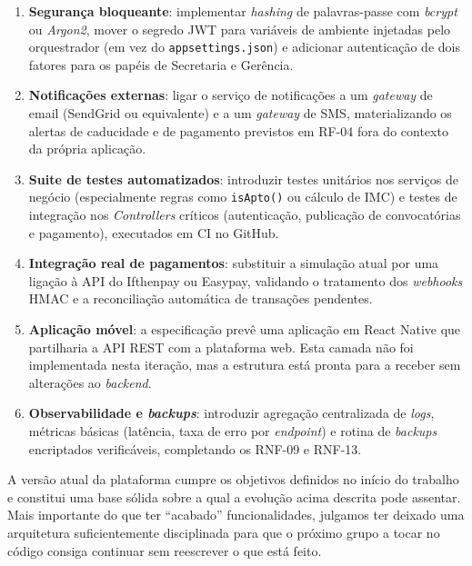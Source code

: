\begin{enumerate}
    \item \textbf{Segurança bloqueante}: implementar \textit{hashing} de palavras-passe com \textit{bcrypt} ou \textit{Argon2}, mover o segredo JWT para variáveis de ambiente injetadas pelo orquestrador (em vez do \texttt{appsettings.json}) e adicionar autenticação de dois fatores para os papéis de Secretaria e Gerência.
    \item \textbf{Notificações externas}: ligar o serviço de notificações a um \textit{gateway} de email (SendGrid ou equivalente) e a um \textit{gateway} de SMS, materializando os alertas de caducidade e de pagamento previstos em RF-04 fora do contexto da própria aplicação.
    \item \textbf{Suite de testes automatizados}: introduzir testes unitários nos serviços de negócio (especialmente regras como \texttt{isApto()} ou cálculo de IMC) e testes de integração nos \textit{Controllers} críticos (autenticação, publicação de convocatórias e pagamento), executados em CI no GitHub.
    \item \textbf{Integração real de pagamentos}: substituir a simulação atual por uma ligação à API do Ifthenpay ou Easypay, validando o tratamento dos \textit{webhooks} HMAC e a reconciliação automática de transações pendentes.
    \item \textbf{Aplicação móvel}: a especificação prevê uma aplicação em React Native que partilharia a API REST com a plataforma web. Esta camada não foi implementada nesta iteração, mas a estrutura está pronta para a receber sem alterações ao \textit{backend}.
    \item \textbf{Observabilidade e \textit{backups}}: introduzir agregação centralizada de \textit{logs}, métricas básicas (latência, taxa de erro por \textit{endpoint}) e rotina de \textit{backups} encriptados verificáveis, completando os RNF-09 e RNF-13.
\end{enumerate}

A versão atual da plataforma cumpre os objetivos definidos no início do trabalho e constitui uma base sólida sobre a qual a evolução acima descrita pode assentar. Mais importante do que ter ``acabado'' funcionalidades, julgamos ter deixado uma arquitetura suficientemente disciplinada para que o próximo grupo a tocar no código consiga continuar sem reescrever o que está feito.
